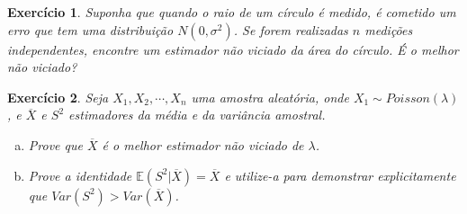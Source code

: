\documentclass[letter,11pt]{article}
\newtheorem{exer}{Exercício}
\newcommand{\E}{\mathbb{E}}
\begin{document}
\begin{exer} \rm 
Suponha que quando o raio de um círculo é medido, é cometido um erro que tem uma distribuição $N(0,\sigma^2)$. Se forem realizadas $n$ medições independentes, encontre um estimador não viciado da área do círculo. É o melhor não viciado?
\end{exer}


\begin{exer} \rm 
Seja $X_1,X_2,\cdots,X_n$ uma amostra aleatória, onde $X_1\sim Poisson(\lambda)$, e $\overline{X}$ e $S^2$ estimadores da média e da variância amostral.
\begin{enumerate}[a)]
\item Prove que $\overline{X}$ é o melhor estimador não viciado de $\lambda$.

\item Prove a identidade  $\E(S^2|\overline{X})=\overline{X}$ e utilize-a para demonstrar explicitamente que $Var(S^2)>Var(\overline{X})$.
\end{enumerate}\end{exer}
\end{document}
